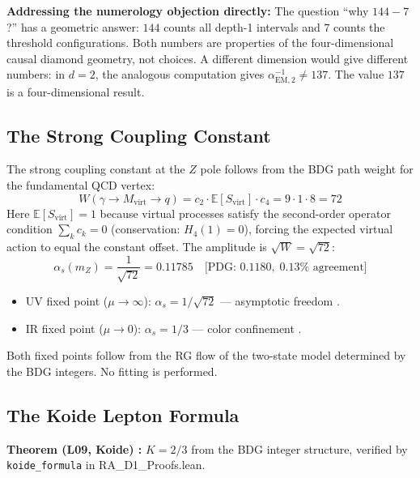 \documentclass[12pt,a4paper]{article}
\begin{document}
\textbf{Addressing the numerology objection directly:} The question ``why $144-7$?'' has a geometric answer: $144$ counts all depth-1 intervals and $7$ counts the threshold configurations.  Both numbers are properties of the four-dimensional causal diamond geometry, not choices.  A different dimension would give different numbers: in $d=2$, the analogous computation gives $\alpha_{\mathrm{EM},2}^{-1} \neq 137$.  The value $137$ is a four-dimensional result.

\subsection{The Strong Coupling Constant}

The strong coupling constant at the $Z$ pole follows from the BDG path weight for the fundamental QCD vertex:
\begin{equation}
  W(\gamma \to M_{\mathrm{virt}} \to q) = c_2 \cdot \mathbb{E}[S_{\mathrm{virt}}] \cdot c_4 = 9 \cdot 1 \cdot 8 = 72
  \label{eq:W72}
\end{equation}
Here $\mathbb{E}[S_{\mathrm{virt}}] = 1$ because virtual processes satisfy the second-order operator condition $\sum_k c_k = 0$ (conservation: $H_4(1)=0$), forcing the expected virtual action to equal the constant offset.  The amplitude is $\sqrt{W} = \sqrt{72}$:
\begin{equation}
  \alpha_s(m_Z) = \frac{1}{\sqrt{72}} = 0.11785 \quad \text{[PDG: } 0.1180,\; 0.13\%\text{ agreement]}
  \label{eq:alphas}
\end{equation}

\begin{itemize}
  \item UV fixed point ($\mu\to\infty$): $\alpha_s = 1/\sqrt{72}$ — asymptotic freedom \statusCV.
  \item IR fixed point ($\mu\to 0$): $\alpha_s = 1/3$ — color confinement \statusCV.
\end{itemize}

Both fixed points follow from the RG flow of the two-state model determined by the BDG integers.  No fitting is performed.

\subsection{The Koide Lepton Formula}

\begin{leanbox}
\textbf{Theorem (L09, Koide) \statusLV:} $K = 2/3$ from the BDG integer structure, verified by \texttt{koide\_formula} in RA\_D1\_Proofs.lean.
\end{leanbox}
\end{document}
